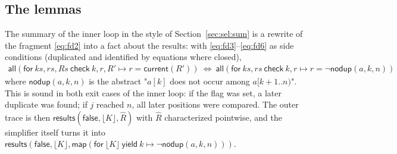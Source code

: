 \documentclass[11pt,a4paper]{article}
\newcommand{\bl}[1]{\lfloor #1\rfloor}                       %
\newcommand{\mapc}[2]{\mathsf{map}(\mathsf{for}\ #1\ \mathsf{yield}\ #2)}
\newcommand{\al}[2]{\mathsf{all}(\mathsf{for}\ #1\ \mathsf{check}\ #2)}
\newcommand{\cur}{\mathsf{current}}
\newcommand{\seq}[1]{\hat{#1}}                               %
\begin{document}
\subsection{The lemmas}
The summary of the inner loop in the style of Section~\ref{sec:sel:sum} is a rewrite of the fragment \eqref{eq:fd2}
into a fact about the results: with \eqref{eq:fd3}--\eqref{eq:fd6} as
side conditions (duplicated and identified by equations where closed),
\begin{align*}
  \al{ks, rs, Rs}{k, r, R' \mapsto r = \cur(R')}\ \Longleftrightarrow\ \al{ks, rs}{k, r \mapsto r = \neg\mathsf{nodup}(a, k, n)}
\end{align*}
where $\mathsf{nodup}(a, k, n)$ is the abstract "$a[k]$ does not occur among $a[k + 1..n)$". This is
sound in both exit cases of the inner loop: if the flag was set, a later duplicate was found; if $j$
reached $n$, all later positions were compared. The outer trace is then
$\mathsf{results}(\mathsf{false}, \bl{K}, \seq{R})$ with $\seq{R}$ characterized pointwise, and the
simplifier itself turns it into $\mathsf{results}(\mathsf{false}, \bl{K}, \mapc{\bl{K}}{k \mapsto \neg\mathsf{nodup}(a, k, n)})$.
\end{document}
